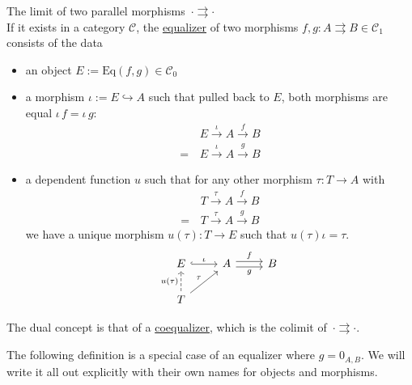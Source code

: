 \begin{definition}
The limit of two parallel morphisms $\,\cdot \rightrightarrows \cdot$\\
If it exists in a category $\mathcal{C}$, the \ul{equalizer} of two morphisms $f, g : A \rightrightarrows B \in \mathcal{C}_{1}$
consists of the data
\begin{itemize}
\item an object $E := \mathrm{Eq}(f,g) \in \mathcal{C}_{0}$
\item a morphism $\iota := E \hookrightarrow A$ such that pulled back to $E$, both morphisms are equal $\iota\,f = \iota\,g$:
\begin{align*}
&E \xrightarrow{\iota} A \xrightarrow{f} B \\
=\, &E \xrightarrow{\iota} A \xrightarrow{g} B
\end{align*}
\item a dependent function $u$ such that for any other morphism $\tau : T \rightarrow A$ with
\begin{align*}
&T \xrightarrow{\tau} A \xrightarrow{f} B \\
=\, &T \xrightarrow{\tau} A \xrightarrow{g} B
\end{align*}
we have a unique morphism $u( \tau ) : T \rightarrow E$ such that $u( \tau ) \iota = \tau$.
\[
\begin{tikzcd}
E \arrow[r, "\iota", hook]                              & A \arrow[r, "f", shift left] \arrow[r, "g"', shift right] & B \\
T \arrow[ru, "\tau"] \arrow[u, "u(\tau)", dashed] &                                                           &  
\end{tikzcd}
\]
\end{itemize}
The dual concept is that of a \ul{coequalizer}, which is the colimit of $\,\cdot \rightrightarrows \cdot$.
\end{definition}

The following definition is a special case of an equalizer where $g = 0_{A,B}$. We will write it all out explicitly with their
own names for objects and morphisms.

